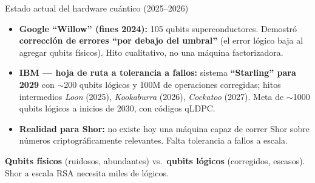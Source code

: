 \documentclass[aspectratio=169]{beamer}
\begin{document}
\begin{frame}{Estado actual del hardware cuántico (2025--2026)}
  \begin{itemize}
    \item \textbf{Google ``Willow'' (fines 2024):} 105 qubits superconductores.
          Demostró \textbf{corrección de errores ``por debajo del umbral''}
          (el error lógico baja al agregar qubits físicos). Hito cualitativo,
          no una máquina factorizadora.
    \item \textbf{IBM — hoja de ruta a tolerancia a fallos:}
          sistema \textbf{``Starling'' para 2029} con $\sim$200 qubits lógicos
          y 100M de operaciones corregidas; hitos intermedios \emph{Loon} (2025),
          \emph{Kookaburra} (2026), \emph{Cockatoo} (2027). Meta de
          $\sim$1000 qubits lógicos a inicios de 2030, con códigos qLDPC.
    \item \textbf{Realidad para Shor:} no existe hoy una máquina capaz de
          correr Shor sobre números criptográficamente relevantes. Falta
          tolerancia a fallos a escala.
  \end{itemize}

  \begin{block}{}
    \small \textbf{Qubits físicos} (ruidosos, abundantes)
    vs.\ \textbf{qubits lógicos} (corregidos, escasos).
    Shor a escala RSA necesita miles de lógicos.
  \end{block}

\end{frame}
\end{document}
